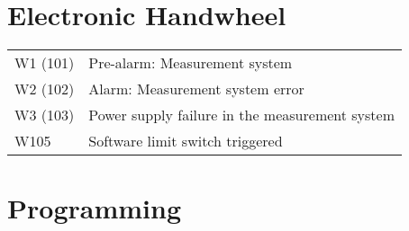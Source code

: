 \documentclass[openany,11pt]{book}
\begin{document}
\section*{Electronic Handwheel}

\begin{table}[!h]
    \begin{tabular}{ll}
    W1 (101)  & Pre-alarm: Measurement system \\
    W2 (102)  & Alarm: Measurement system error \\
    W3 (103)  & Power supply failure in the measurement system \\
    W105      & Software limit switch triggered \\
    \end{tabular}
\end{table}

\newpage
\section*{Programming}
\end{document}
